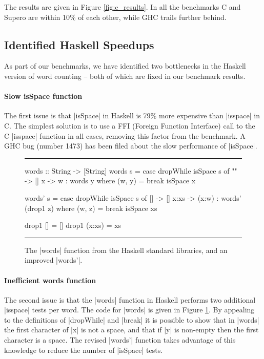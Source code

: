 \documentclass{llncs}
\newenvironment{fig}
    {\begin{figure}[tbp]\hrule}
    {\end{figure}}
\newcommand{\figend}{\hrule}
\newcommand{\perc}{\%
    }
\begin{document}
The results are given in Figure \ref{fig:c_results}. In all the benchmarks C and Supero are within 10\% of each other, while GHC trails further behind.

\subsection{Identified Haskell Speedups}

As part of our benchmarks, we have identified two bottlenecks in the Haskell version of word counting -- both of which are fixed in our benchmark results.

\paragraph{Slow \textsf{isSpace} function}

The first issue is that |isSpace| in Haskell is 79\perc more expensive than |isspace| in C. The simplest solution is to use a FFI (Foreign Function Interface) \cite{spj:awkward_squad} call to the C |isspace| function in all cases, removing this factor from the benchmark. A GHC bug (number 1473) has been filed about the slow performance of |isSpace|.

\begin{fig}
\begin{code}
words :: String -> [String]
words s = case  dropWhile isSpace s of
                ""  ->  []
                x   ->  w : words y
                        where (w, y) = break isSpace x

words' s = case  dropWhile isSpace s of
                 []    ->  []
                 x:xs  ->  (x:w) : words' (drop1 z)
                           where (w, z) = break isSpace xs

drop1 []      = []
drop1 (x:xs)  = xs
\end{code}
\figend
\caption{The |words| function from the Haskell standard libraries, and an improved |words'|.}
\label{fig:words}
\end{fig}

\paragraph{Inefficient \textsf{words} function}

The second issue is that the |words| function in Haskell performs two additional |isspace| tests per word. The code for |words| is given in Figure \ref{fig:words}. By appealing to the definitions of |dropWhile| and |break| it is possible to show that in |words| the first character of |x| is not a space, and that if |y| is non-empty then the first character is a space. The revised |words'| function takes advantage of this knowledge to reduce the number of |isSpace| tests.
\end{document}
